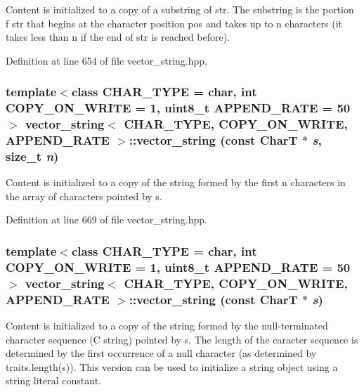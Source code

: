 Content is initialized to a copy of a substring of str. The substring is the portion f str that begins at the character position pos and takes up to n characters (it takes less than n if the end of str is reached before). 

Definition at line 654 of file vector\_\-string.hpp.\hypertarget{classvector__string_345f4bd7b0d68d78718a68f410fa0982}{
\subsubsection[{vector\_\-string}]{\setlength{\rightskip}{0pt plus 5cm}template$<$class CHAR\_\-TYPE  = char, int COPY\_\-ON\_\-WRITE = 1, uint8\_\-t APPEND\_\-RATE = 50$>$ {\bf vector\_\-string}$<$ CHAR\_\-TYPE, COPY\_\-ON\_\-WRITE, APPEND\_\-RATE $>$::{\bf vector\_\-string} (const CharT $\ast$ {\em s}, \/  size\_\-t {\em n})}}
\label{classvector__string_345f4bd7b0d68d78718a68f410fa0982}


Content is initialized to a copy of the string formed by the first n characters in the array of characters pointed by s. 

Definition at line 669 of file vector\_\-string.hpp.\hypertarget{classvector__string_00789b3e4fc51227e7e5ecd83a1a0936}{
\subsubsection[{vector\_\-string}]{\setlength{\rightskip}{0pt plus 5cm}template$<$class CHAR\_\-TYPE  = char, int COPY\_\-ON\_\-WRITE = 1, uint8\_\-t APPEND\_\-RATE = 50$>$ {\bf vector\_\-string}$<$ CHAR\_\-TYPE, COPY\_\-ON\_\-WRITE, APPEND\_\-RATE $>$::{\bf vector\_\-string} (const CharT $\ast$ {\em s})}}
\label{classvector__string_00789b3e4fc51227e7e5ecd83a1a0936}


Content is initialized to a copy of the string formed by the null-terminated character sequence (C string) pointed by s. The length of the caracter sequence is determined by the first occurrence of a null character (as determined by traits.length(s)). This version can be used to initialize a string object using a string literal constant. 

